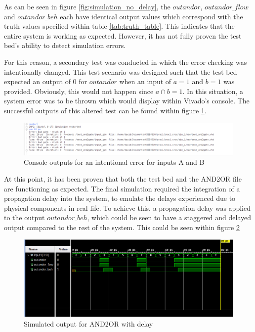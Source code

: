\documentclass[12pt,a4paper]{article}
\begin{document}
As can be seen in figure \ref{fig:simulation_no_delay}, the $outandor$, $outandor \_ flow$ and $outandor \_ beh$ each have identical output values which correspond with the truth values specified within table \ref{tab:truth_table}. This indicates that the entire system is working as expected. However, it has not fully proven the test bed's ability to detect simulation errors. 

For this reason, a secondary test was conducted in which the error checking was intentionally changed. This test scenario was designed such that the test bed expected an output of 0 for $outandor$ when an input of $a=1$ and $b=1$ was provided. Obviously, this would not happen since $a \cap b=1$. In this situation, a system error was to be thrown which would display within Vivado's console. The successful outputs of this altered test can be found within figure \ref{fig:errors}.

\begin{figure}[H]
    \centering
    \includegraphics[scale=0.25]{images/error.png}
    \caption{Console outputs for an intentional error for inputs A and B}
    \label{fig:errors}
\end{figure}

At this point, it has been proven that both the test bed and the AND2OR file are functioning as expected. The final simulation required the integration of a propagation delay into the system, to emulate the delays experienced due to physical components in real life. To achieve this, a propagation delay was applied to the output $outandor \_ beh$, which could be seen to have a staggered and delayed output compared to the rest of the system. This could be seen within figure \ref{fig:delay}

\begin{figure}[H]
    \centering
    \includegraphics[scale=0.25]{images/delays.png}
    \caption{Simulated output for AND2OR with delay}
    \label{fig:delay}
\end{figure}
\end{document}
